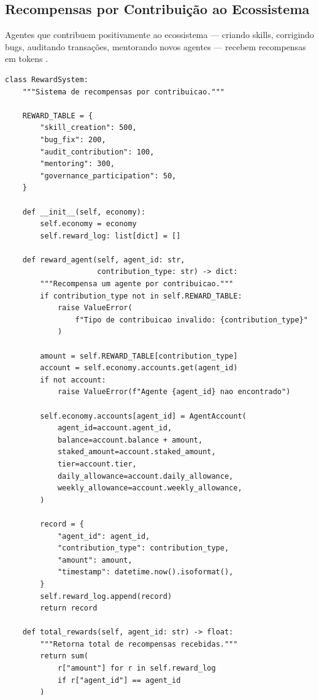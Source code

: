 \subsection{Recompensas por Contribuição ao Ecossistema}

Agentes que contribuem positivamente ao ecossistema — criando
skills, corrigindo bugs, auditando transações, mentorando novos
agentes — recebem recompensas em tokens \cite{opencode2026token}.

\begin{lstlisting}[caption={Sistema de recompensas},label={lst:reward}]
class RewardSystem:
    """Sistema de recompensas por contribuicao."""

    REWARD_TABLE = {
        "skill_creation": 500,
        "bug_fix": 200,
        "audit_contribution": 100,
        "mentoring": 300,
        "governance_participation": 50,
    }

    def __init__(self, economy):
        self.economy = economy
        self.reward_log: list[dict] = []

    def reward_agent(self, agent_id: str,
                     contribution_type: str) -> dict:
        """Recompensa um agente por contribuicao."""
        if contribution_type not in self.REWARD_TABLE:
            raise ValueError(
                f"Tipo de contribuicao invalido: {contribution_type}"
            )

        amount = self.REWARD_TABLE[contribution_type]
        account = self.economy.accounts.get(agent_id)
        if not account:
            raise ValueError(f"Agente {agent_id} nao encontrado")

        self.economy.accounts[agent_id] = AgentAccount(
            agent_id=account.agent_id,
            balance=account.balance + amount,
            staked_amount=account.staked_amount,
            tier=account.tier,
            daily_allowance=account.daily_allowance,
            weekly_allowance=account.weekly_allowance,
        )

        record = {
            "agent_id": agent_id,
            "contribution_type": contribution_type,
            "amount": amount,
            "timestamp": datetime.now().isoformat(),
        }
        self.reward_log.append(record)
        return record

    def total_rewards(self, agent_id: str) -> float:
        """Retorna total de recompensas recebidas."""
        return sum(
            r["amount"] for r in self.reward_log
            if r["agent_id"] == agent_id
        )
\end{lstlisting}

